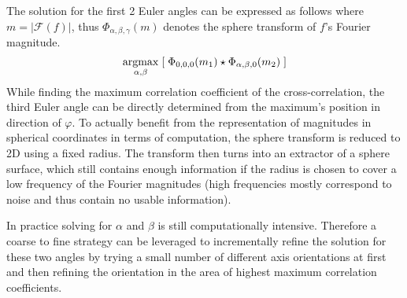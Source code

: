 The solution for the first 2 Euler angles can be expressed as follows where $m = |\mathcal{F}(f)|$, thus $\Phi_{\alpha,\beta,\gamma}(m)$ denotes the sphere transform of $f$'s Fourier magnitude.
\begin{equation}
\operatorname*{argmax}_{\alpha,\beta}\;[\;\Phi_{0,0,0}(m_1) \star \Phi_{\alpha,\beta,0}(m_2)\;]
\end{equation}
While finding the maximum correlation coefficient of the cross-correlation, the third Euler angle can be directly determined from the maximum's position in direction of $\varphi$.
To actually benefit from the representation of magnitudes in spherical coordinates in terms of computation, the sphere transform is reduced to 2D using a fixed radius. 
The transform then turns into an extractor of a sphere surface, which still contains enough information if the radius is chosen to cover a low frequency of the Fourier magnitudes (high frequencies mostly correspond to noise and thus contain no usable information).

In practice solving for $\alpha$ and $\beta$ is still computationally intensive. 
Therefore a coarse to fine strategy can be leveraged to incrementally refine the solution for these two angles by trying a small number of different axis orientations at first and then refining the orientation in the area of highest maximum correlation coefficients.

